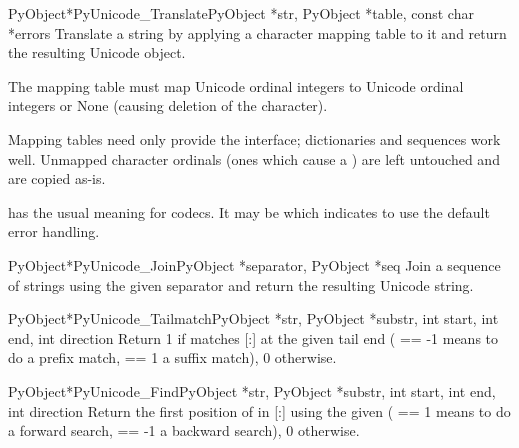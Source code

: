 \begin{cfuncdesc}{PyObject*}{PyUnicode_Translate}{PyObject *str,
                                                  PyObject *table,
                                                  const char *errors}
  Translate a string by applying a character mapping table to it and
  return the resulting Unicode object.

  The mapping table must map Unicode ordinal integers to Unicode
  ordinal integers or None (causing deletion of the character).

  Mapping tables need only provide the 
  interface; dictionaries and sequences work well.  Unmapped character
  ordinals (ones which cause a ) are left
  untouched and are copied as-is.

   has the usual meaning for codecs. It may be \NULL{}
  which indicates to use the default error handling.
\end{cfuncdesc}

\begin{cfuncdesc}{PyObject*}{PyUnicode_Join}{PyObject *separator,
                                             PyObject *seq}
  Join a sequence of strings using the given separator and return the
  resulting Unicode string.
\end{cfuncdesc}

\begin{cfuncdesc}{PyObject*}{PyUnicode_Tailmatch}{PyObject *str,
                                                  PyObject *substr,
                                                  int start,
                                                  int end,
                                                  int direction}
  Return 1 if  matches [:] at
  the given tail end ( == -1 means to do a prefix
  match,  == 1 a suffix match), 0 otherwise.
\end{cfuncdesc}

\begin{cfuncdesc}{PyObject*}{PyUnicode_Find}{PyObject *str,
                                                  PyObject *substr,
                                                  int start,
                                                  int end,
                                                  int direction}
  Return the first position of  in
  [:] using the given 
  ( == 1 means to do a forward search,
   == -1 a backward search), 0 otherwise.
\end{cfuncdesc}

